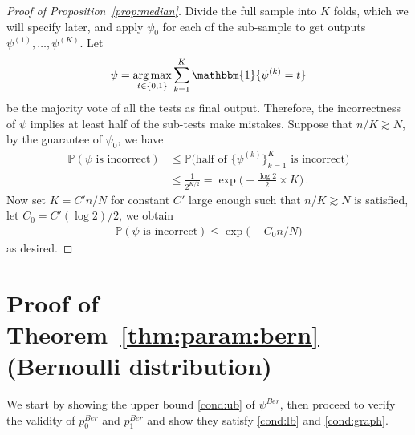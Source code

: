 \documentclass{article}
\theoremstyle{definition}
\theoremstyle{definition}
\theoremstyle{definition}
\theoremstyle{definition}
\theoremstyle{definition}
\theoremstyle{definition}
\theoremstyle{remark}
\theoremstyle{remark}
\DeclareMathOperator*{\argmax}{arg\,max}
\newcommand{\prob}{\mathbb{P}}
\begin{document}
\begin{proof}[Proof of Proposition~\ref{prop:median}]
    Divide the full sample into $K$ folds, which we will specify later, and apply $\psi_0$ for each of the sub-sample to get outputs $\psi^{(1)},\ldots,\psi^{(K)}$. Let 
    \begin{align*}
        \psi = \argmax_{t\in\{0,1\}} \sum_{k=1}^K \mathbbm{1}\{\psi^{(k)}=t\}
    \end{align*}
    be the majority vote of all the tests as final output. Therefore, the incorrectness of $\psi$ implies at least half of the sub-tests make mistakes. Suppose that $n/K \gtrsim N$, by the guarantee of $\psi_0$, we have
    \begin{align*}
        \prob(\psi\text{ is incorrect}) &\le \prob\Big(\text{half of }\{\psi^{(k)}\}_{k=1}^K\text{ is incorrect}\Big) \\
        & \le \frac{1}{2^{K/2}} = \exp\Big(- \frac{\log2}{2}\times K\Big)\,.
    \end{align*}
    Now set $K = C' n/N$ for constant $C'$ large enough such that $n/K \gtrsim N$ is satisfied, let $C_0=C'(\log 2) / 2$, we obtain
    \begin{align*}
        \prob(\psi\text{ is incorrect}) \le \exp\Big(- C_0 n/N\Big)
    \end{align*}
    as desired.
\end{proof}

\section{Proof of Theorem~\ref{thm:param:bern} (Bernoulli distribution)}\label{app:bern}
We start by showing the upper bound \ref{cond:ub} of $\psi^{Ber}$, then proceed to verify the validity of $p_0^{Ber}$ and $p_1^{Ber}$ and show they satisfy \ref{cond:lb} and \ref{cond:graph}.
\end{document}
